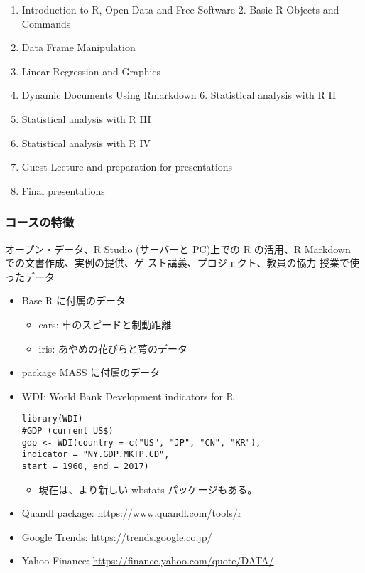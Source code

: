 \documentclass[
]{book}
\providecommand{\tightlist}{%
  \setlength{\itemsep}{0pt}\setlength{\parskip}{0pt}}
\theoremstyle{definition}
\theoremstyle{definition}
\theoremstyle{definition}
\theoremstyle{definition}
\theoremstyle{remark}
\begin{document}
\begin{enumerate}
\def\labelenumi{\arabic{enumi}.}
\tightlist
\item
  Introduction to R, Open Data and Free Software 2. Basic R Objects and Commands
\item
  Data Frame Manipulation
\item
  Linear Regression and Graphics
\item
  Dynamic Documents Using Rmarkdown 6. Statistical analysis with R II
\item
  Statistical analysis with R III
\item
  Statistical analysis with R IV
\item
  Guest Lecture and preparation for presentations
\item
  Final presentations
\end{enumerate}

\hypertarget{ux30b3ux30fcux30b9ux306eux7279ux5fb4}{%
\subsubsection{コースの特徴}\label{ux30b3ux30fcux30b9ux306eux7279ux5fb4}}

オープン・データ、R Studio (サーバーと PC)上での R の活用、R Markdown での文書作成、実例の提供、ゲ スト講義、プロジェクト、教員の協力
授業で使ったデータ

\begin{itemize}
\item
  Base R に付属のデータ

  \begin{itemize}
  \tightlist
  \item
    cars: 車のスピードと制動距離
  \item
    iris: あやめの花びらと萼のデータ
  \end{itemize}
\item
  package MASS に付属のデータ
\item
  WDI: World Bank Development indicators for R

\begin{verbatim}
library(WDI)
#GDP (current US$)
gdp <- WDI(country = c("US", "JP", "CN", "KR"),
indicator = "NY.GDP.MKTP.CD",
start = 1960, end = 2017)
\end{verbatim}

  \begin{itemize}
  \tightlist
  \item
    現在は、より新しい wbstats パッケージもある。
  \end{itemize}
\item
  Quandl package: \url{https://www.quandl.com/tools/r}
\item
  Google Trends: \url{https://trends.google.co.jp/}
\item
  Yahoo Finance: \url{https://finance.yahoo.com/quote/DATA/}
\end{itemize}
\end{document}
